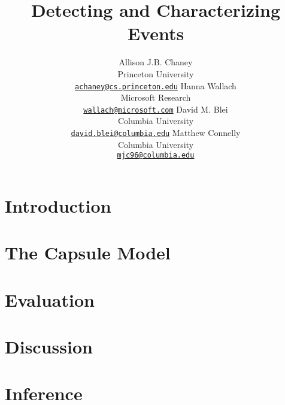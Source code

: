 \documentclass[11pt,letterpaper]{article}
\title{Detecting and Characterizing Events}
\author{
Allison J.B. Chaney\\
    Princeton University\\
	\href{mailto:achaney@cs.princeton.edu}{\nolinkurl{achaney@cs.princeton.edu}}
\And
Hanna Wallach\\
    Microsoft Research\\
    \href{mailto:wallach@microsoft.com}{\nolinkurl{wallach@microsoft.com}}
\AND
David M. Blei\\
    Columbia University\\
    \href{mailto:david.blei@columbia.edu}{\nolinkurl{david.blei@columbia.edu}}
\And
Matthew Connelly\\
    Columbia University\\
    \href{mailto:mjc96@columbia.edu}{\nolinkurl{mjc96@columbia.edu}}
}
\date{}
\begin{document}
\maketitle

\begin{abstract}

\end{abstract}
 

\section{Introduction}
\label{sec:intro}


\section{The Capsule Model}
\label{sec:model}


\section{Evaluation}
\label{sec:eval}


\section{Discussion}
\label{sec:discussion}


\appendix
\section{Inference}
\label{sec:inference}








\end{document}
